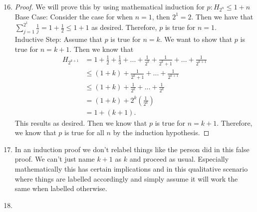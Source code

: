 \documentclass{article}
\begin{document}
\begin{enumerate}
    \setcounter{enumi}{15}
    \item
    
    \begin{proof}
    We will prove this by using mathematical induction for $p: H_{2^n}\leq 1+n$\\
    Base Case: Consider the case for when $n=1$, then $2^1 = 2.$ Then we have that $\sum_{j=1}^{2^1}\frac{1}{j} = 1 + \frac{1}{2} \leq 1 + 1$ as desired. Therefore, $p$ is true for $n=1.$\\
    Inductive Step: Assume that $p$ is true for $n=k$. We want to show that $p$ is true for $n=k+1.$ Then we know that
    \begin{align*}
    H_{2^{k+1}} &= 1+\frac{1}{2} + \frac{1}{3} + ... + \frac{1}{2^k} + \frac{1}{2^k+1} + ... + \frac{1}{2^{k+1}}\\
    &\leq (1 + k)+\frac{1}{2^k+1} + ... + \frac{1}{2^{k+1}}\\
    &\leq (1+k)+\frac{1}{2^k}+...+\frac{1}{2^k}\\
    &= (1+k)+2^k(\frac{1}{2^k})\\
    &= 1+(k+1).
    \end{align*} This results as desired. Then we know that $p$ is true for $n=k+1$. Therefore, we know that $p$ is true for all $n$ by the induction hypothesis.
    \end{proof}
    
    \setcounter{enumi}{23}
    \item
    
    In an induction proof we don't relabel things like the person did in this false proof. We can't just name $k+1$ as $k$ and proceed as usual. Especially mathematically this has certain implications and in this qualitative scenario where things are labelled accordingly and simply assume it will work the same when labelled otherwise.
    
    \setcounter{enumi}{30}
    \item
    

\end{enumerate}
\end{document}

